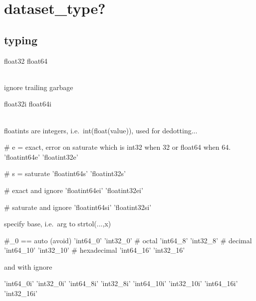 \section{dataset\_type?}

\subsection{typing}

\begin{python}
float32
float64
\end{python}
\\
ignore trailing garbage
\\
\begin{python}
float32i
float64i
\end{python}
\\
floatints are integers, i.e.\ int(float(value)), used for dedotting...
\\
\begin{python}
# e = exact, error on saturate which is int32 when 32 or float64 when 64.
'floatint64e'  
'floatint32e'  
\end{python}

\begin{python}
# s = saturate
'floatint64s'  
'floatint32s'  
\end{python}

\begin{python}
# exact and ignore
'floatint64ei' 
'floatint32ei' 
\end{python}

\begin{python}
# saturate and ignore
'floatint64si' 
'floatint32si' 
\end{python}

specify base, i.e.\ arg to strtol(...,x)
\\
\begin{python}
#_0 == auto (avoid)
    'int64_0'      
    'int32_0'      
# octal
    'int64_8'      
    'int32_8'      
# decimal
    'int64_10'     
    'int32_10'     
# hexadecimal
    'int64_16'     
    'int32_16'     
\end{python}

and with ignore
\\
\begin{python}
    'int64_0i'     
    'int32_0i'     
    'int64_8i'     
    'int32_8i'     
    'int64_10i'    
    'int32_10i'    
    'int64_16i'    
    'int32_16i'    
\end{python}

